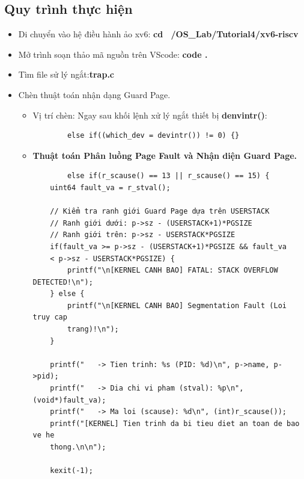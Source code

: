 \subsection{Quy trình thực hiện}
\begin{itemize}
    \item Di chuyển vào hệ điều hành ảo xv6: \textbf{cd ~/OS\_Lab/Tutorial4/xv6-riscv}
    \item Mở trình soạn thảo mã nguồn trên VScode: \textbf{code .}
    \item Tìm file sử lý ngắt:\textbf{trap.c}
    \item Chèn thuật toán nhận dạng Guard Page.
    \begin{itemize}
        \item Vị trí chèn: Ngay sau khối lệnh xử lý ngắt thiết bị \textbf{denvintr()}:
    
    \begin{verbatim}
        else if((which_dev = devintr()) != 0) {}
    \end{verbatim}
        \item \textbf{Thuật toán Phân luồng Page Fault và Nhận diện Guard Page.}
     \begin{verbatim}
        else if(r_scause() == 13 || r_scause() == 15) {
    uint64 fault_va = r_stval(); 
    
    // Kiểm tra ranh giới Guard Page dựa trên USERSTACK
    // Ranh giới dưới: p->sz - (USERSTACK+1)*PGSIZE
    // Ranh giới trên: p->sz - USERSTACK*PGSIZE
    if(fault_va >= p->sz - (USERSTACK+1)*PGSIZE && fault_va 
    < p->sz - USERSTACK*PGSIZE) {
        printf("\n[KERNEL CANH BAO] FATAL: STACK OVERFLOW DETECTED!\n");
    } else {
        printf("\n[KERNEL CANH BAO] Segmentation Fault (Loi truy cap 
        trang)!\n");
    }

    printf("   -> Tien trinh: %s (PID: %d)\n", p->name, p->pid);
    printf("   -> Dia chi vi pham (stval): %p\n", (void*)fault_va);
    printf("   -> Ma loi (scause): %d\n", (int)r_scause());
    printf("[KERNEL] Tien trinh da bi tieu diet an toan de bao ve he
    thong.\n\n");

    kexit(-1); 
  
    \end{verbatim}
    

\end{itemize}
\end{itemize}
